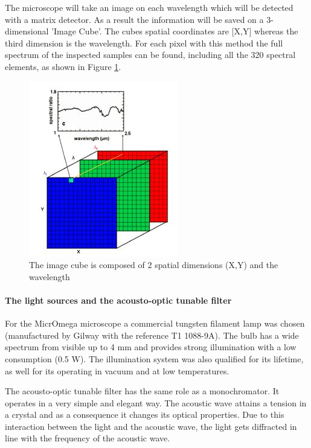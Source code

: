 The microscope will take an image on each wavelength which will be detected with a matrix detector. As a result the information will be saved on a 3-dimensional  'Image Cube'. The cubes spatial coordinates are [X,Y] whereas the third dimension is the wavelength. For each pixel with this method the full spectrum of the inspected samples can be found, including all the 320 spectral elements, as shown in Figure \ref{fig:Image_cube}.

\begin{figure}[htb]
  \centering
  \includegraphics[width=.48\textwidth]{figures/BFfig/Image_cube}
  \caption{The image cube is composed of 2 spatial dimensions (X,Y) and the wavelength}
  \label{fig:Image_cube}
\end{figure}

\paragraph{The light sources and the acousto-optic tunable filter}

For the MicrOmega microscope a commercial tungsten filament lamp was chosen (manufactured by Gilway with the reference T1 1088-9A). The bulb has a wide spectrum from visible up to 4 mm and provides strong illumination with a low consumption (0.5 W). The illumination system was also qualified for its lifetime, as well for its operating in vacuum and at low temperatures.

The acousto-optic tunable filter has the same role as a monochromator. It operates in a very simple and elegant way. The acoustic wave attains a tension in a crystal and as a consequence it changes its optical properties. Due to this interaction between the light and the acoustic wave, the light gets diffracted in line with the frequency of the acoustic wave.

